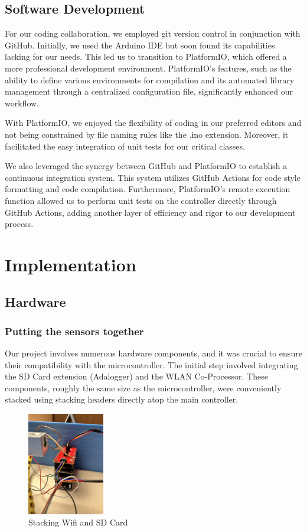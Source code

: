 \documentclass{article}
\begin{document}
\subsection{Software Development}
For our coding collaboration, we employed git version control in conjunction with GitHub. Initially, we used the Arduino IDE but soon found its capabilities lacking for our needs. This led us to transition to PlatformIO, which offered a more professional development environment. PlatformIO's features, such as the ability to define various environments for compilation and its automated library management through a centralized configuration file, significantly enhanced our workflow.

With PlatformIO, we enjoyed the flexibility of coding in our preferred editors and not being constrained by file naming rules like the .ino extension. Moreover, it facilitated the easy integration of unit tests for our critical classes.

We also leveraged the synergy between GitHub and PlatformIO to establish a continuous integration system. This system utilizes GitHub Actions for code style formatting and code compilation. Furthermore, PlatformIO's remote execution function allowed us to perform unit tests on the controller directly through GitHub Actions, adding another layer of efficiency and rigor to our development process.

\section{Implementation}

\subsection{Hardware}

\subsubsection{Putting the sensors together}
Our project involves numerous hardware components, and it was crucial to ensure their compatibility with the microcontroller. The initial step involved integrating the SD Card extension (Adalogger) and the WLAN Co-Processor. These components, roughly the same size as the microcontroller, were conveniently stacked using stacking headers directly atop the main controller.

\begin{figure}[h]
	\centering
	\includegraphics[angle=90,width=0.3\textwidth]{controller.jpeg}
	\caption{Stacking Wifi and SD Card}
\end{figure}
\end{document}
